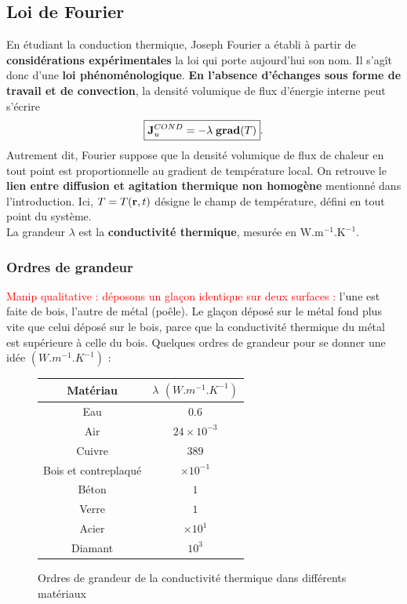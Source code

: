\documentclass[11pt,a4paper]{report}
\begin{document}
\subsection{Loi de Fourier}

En étudiant la conduction thermique, Joseph Fourier a établi à partir de \textbf{considérations expérimentales} la loi qui porte aujourd'hui son nom. Il s'agît donc d'une \textbf{loi phénoménologique}. \textbf{En l'absence d'échanges sous forme de travail et de convection}, la densité volumique de flux d'énergie interne peut s'écrire
\begin{equation}
	\boxed{\bold{J}_u^{COND} = - \lambda \;\text{\textbf{grad}}(T)}.
	\label{eq:Fourier_law}
\end{equation}
Autrement dit, Fourier suppose que la densité volumique de flux de chaleur en tout point est proportionnelle au gradient de température local. On retrouve le \textbf{lien entre diffusion et agitation thermique non homogène} mentionné dans l'introduction. Ici, $T = T(\bold{r},t)$ désigne le champ de température, défini en tout point du système.\\

La grandeur $\lambda$ est la \textbf{conductivité thermique}, mesurée en $\text{W}.\text{m}^{-1}.\text{K}^{-1}$.

\subsubsection{Ordres de grandeur}

\textcolor{red}{Manip qualitative : déposons un glaçon identique sur deux surfaces :} l'une est faite de bois, l'autre de métal (poêle). Le glaçon déposé sur le métal fond plus vite
que celui déposé sur le bois, parce que la conductivité thermique du métal est supérieure à celle du bois. Quelques ordres de grandeur pour se donner une idée $(W.m^{-1}.K^{-1})$ :

\begin{figure}[h!]
	\begin{center}
		\begin{tabular}{|c|c|}
		\hline
		\textbf{Matériau} & $\lambda$ $(W.m^{-1}.K^{-1})$\\
		\hline
		Eau & $0.6$\\
		\hline
		Air & $24\times10^{-3}$\\
		\hline
		Cuivre & $389$\\
		\hline
		Bois et contreplaqué & $\times10^{-1}$\\
		\hline
		Béton & $1$\\
		\hline
		Verre & $1$\\
		\hline
		Acier & $\times10^{1}$\\
		\hline
		Diamant & $10^3$\\
		\hline
		\end{tabular}
	\end{center}
	\caption{Ordres de grandeur de la conductivité thermique dans différents matériaux}
\end{figure}
\end{document}
